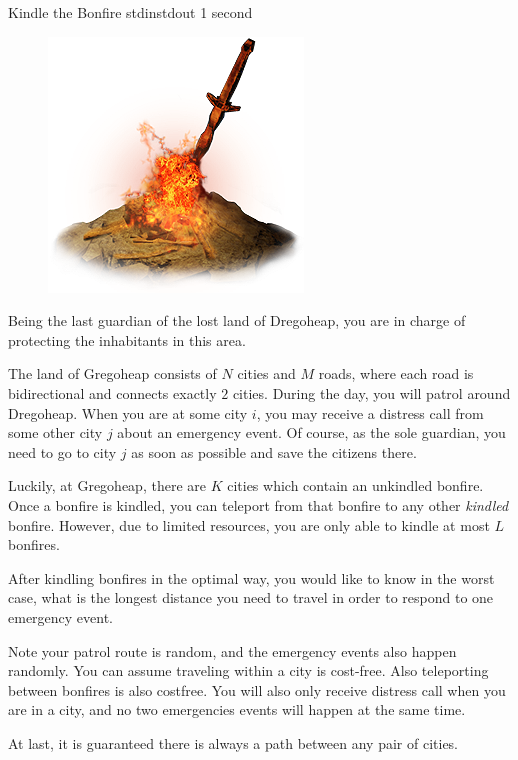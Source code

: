 \begin{problem}{Kindle the Bonfire}
{stdin}{stdout}
{1 second}{}{}

\begin{figure}
    \includegraphics[scale=0.5]{bonfire.png}
\end{figure}

Being the last guardian of the lost land of Dregoheap, you are in charge 
of protecting the inhabitants in this area.

The land of Gregoheap consists of $N$ cities and $M$ roads, where each road
is bidirectional and connects exactly $2$ cities. During the day, you will
patrol around Dregoheap. When you are at some city $i$, you may receive a
distress call from some other city $j$ about an emergency event. Of course, as 
the sole guardian, you need to go to city $j$ as soon as possible  and save the
citizens there.

Luckily, at Gregoheap, there are $K$ cities which contain an unkindled bonfire.
Once a bonfire is kindled, you can teleport from that bonfire to any other 
\textit{kindled} bonfire. However, due to limited resources, you are only able 
to kindle at most $L$ bonfires.

After kindling bonfires in the optimal way,
you would like to know in the worst case, what is the longest distance you need
to travel in order to respond to one emergency event.

Note your patrol route is random, and the emergency events also happen 
randomly. You can assume traveling within a city is cost-free. Also 
teleporting between bonfires is also costfree. You will also only receive 
distress call when you are in a city, and no two emergencies events will happen
at the same time.

At last, it is guaranteed there is always a path between any pair of cities.


\end{problem}
